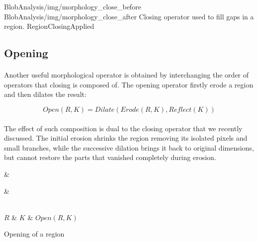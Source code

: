\twoFigures
{BlobAnalysis/img/morphology_close_before}
{BlobAnalysis/img/morphology_close_after}
{Closing operator used to fill gaps in a region.}
{RegionClosingApplied}
{\basicWidth}

\subsection{Opening}

\paragraph*{}
Another useful morphological operator is obtained by interchanging the order of operators that closing is composed of. The opening operator firstly erode a region and then dilates the result:

\[
	Open(R,K) = Dilate(Erode(R, K), Reflect(K))
\] 

\paragraph*{}
The effect of such composition is dual to the closing operator that we recently discussed. The initial erosion shrinks the region removing its isolated pixels and small branches, while the successive dilation brings it back to original dimensions, but cannot restore the parts that vanished completely during erosion.

\newarray\openingInput
{}

\newarray\openingKernel
{}

\newarray\openingResult
{}

\begin{table}[h]
\centering
{}

 &
 &

\\

$R$ &
$K$ &
$Open(R,K)$

\endtabular
\caption{Opening of a region}
\label{tab:RegionOpening}
\end{table}

